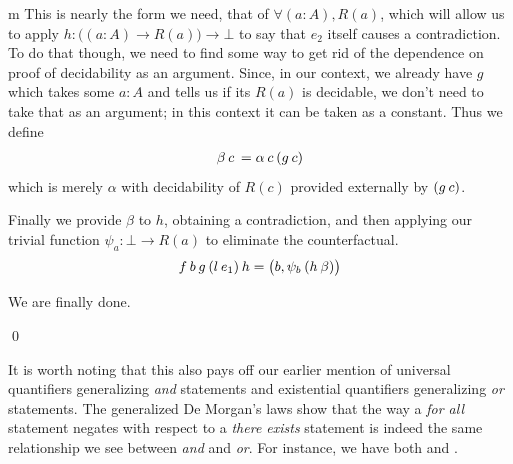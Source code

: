 \documentclass[11pt]{article}
\begin{document}
\begin{my proof}{m}
This is nearly the form we need, that of $\forall (a : A), R(a)$, which will allow us to apply $h \colon \big((a : A) \to R(a) \big) \to \bot$ to say that $e_2$ itself causes a contradiction. To do that though, we need to find some way to get rid of the dependence on proof of decidability as an argument. Since, in our context, we already have $g$ which takes some $a : A$ and tells us if its $R(a)$ is decidable, we don't need to take that as an argument; in this context it can be taken as a constant. Thus we define \begin{gather*}
\beta \hspace{0.2em} c \hspace{0.2em} = \alpha \hspace{0.2em} c \hspace{0.2em} (g \hspace{0.2em} c)
\end{gather*}
which is merely $\alpha$ with decidability of $R(c)$ provided externally by $(g \hspace{0.2em} c)$.

Finally we provide $\beta$ to $h$, obtaining a contradiction, and then applying our trivial function $\psi_a \colon \bot \to R(a)$ to eliminate the counterfactual. \begin{gather*}
f \hspace{0.2em} b \hspace{0.2em} g \hspace{0.2em} (l \hspace{0.2em} e_1) \hspace{0.2em} h = \big(b, \psi_b \hspace{0.2em} (h \hspace{0.2em} \beta) \big)
\end{gather*}

We are finally done.

\qed

\end{my proof}

It is worth noting that this also pays off our earlier mention of universal quantifiers generalizing \emph{and} statements and existential quantifiers generalizing \emph{or} statements. The generalized De Morgan's laws show that the way a \emph{for all} statement negates with respect to a \emph{there exists} statement is indeed the same relationship we see between \emph{and} and \emph{or}. For instance, we have both  and .
\end{document}
